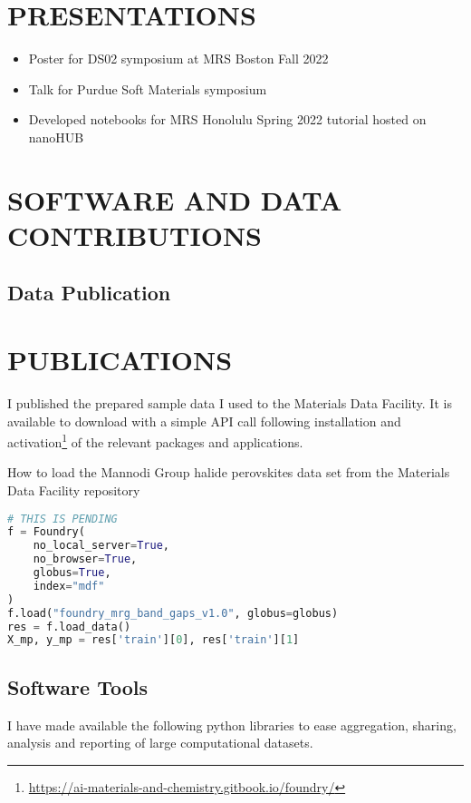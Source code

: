 \chapter{PRESENTATIONS}
\label{sec:orgcd78d4b}
\begin{itemize}
\item Poster for DS02 symposium at MRS Boston Fall 2022
\autocite{2022-novel-halid}
\item Talk for Purdue Soft Materials symposium
\autocite{2022-machin-learn}
\item Developed notebooks
\autocite{manganaris-2022-mrs-comput}
for MRS Honolulu Spring 2022 tutorial hosted on nanoHUB
\autocite{2022-ds00-tutor}
\end{itemize}

\chapter{SOFTWARE AND DATA CONTRIBUTIONS}
\label{sec:orga3ae64f}
\section{Data Publication}
\chapter{PUBLICATIONS}
\label{sec:org052c030}
I published the prepared sample data I used to the Materials Data Facility.
It is available to download with a simple API call following installation and activation\footnote{\url{https://ai-materials-and-chemistry.gitbook.io/foundry/}} of the relevant packages and applications.

\begin{ZZlisting}
  \caption{\label{lst:MDF} How to load the Mannodi Group halide perovskites data set from the Materials Data Facility repository}
  \begin{CenteredBox}
    \begin{lstlisting}[language=python]
# THIS IS PENDING
f = Foundry(
    no_local_server=True,
    no_browser=True,
    globus=True,
    index="mdf"
)
f.load("foundry_mrg_band_gaps_v1.0", globus=globus)
res = f.load_data()
X_mp, y_mp = res['train'][0], res['train'][1]
    \end{lstlisting}
  \end{CenteredBox}
\end{ZZlisting}

\section{Software Tools}
\label{sec:org85fe2a5}
I have made available the following python libraries to ease aggregation, sharing, analysis and reporting of large computational datasets.

